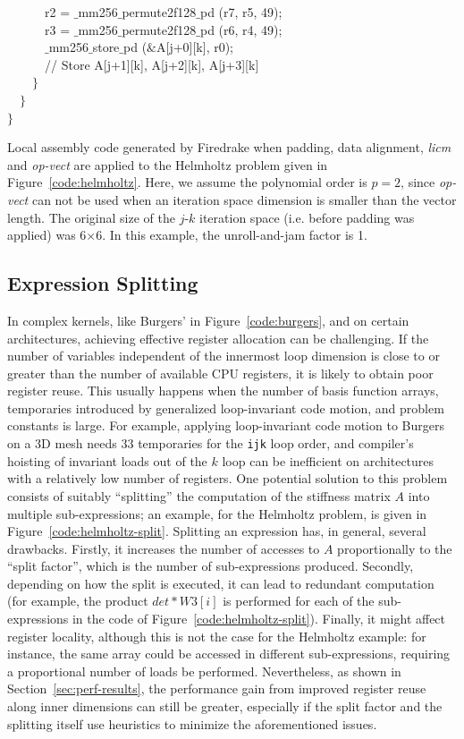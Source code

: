 \documentclass[conference]{IEEEtran}
\begin{document}
\begin{algorithm}[t]
~~~~~~r2 = $\_$mm256$\_$permute2f128$\_$pd (r7, r5, 49);\\
~~~~~~r3 = $\_$mm256$\_$permute2f128$\_$pd (r6, r4, 49);\\
~~~~~~$\_$mm256$\_$store$\_$pd ($\&$A[j+0][k], r0);\\
~~~~~~// Store A[j+1][k], A[j+2][k], A[j+3][k]\\
~~~~$\rbrace$\\
~~$\rbrace$\\
$\rbrace$
\caption{Local assembly code generated by Firedrake when padding, data alignment, \emph{licm} and \emph{op-vect} are applied to the Helmholtz problem given in Figure~\ref{code:helmholtz}. Here, we assume the polynomial order is $p=2$, since \emph{op-vect} can not be used when an iteration space dimension is smaller than the vector length. The original size of the $j$-$k$ iteration space (i.e. before padding was applied) was 6$\times$6. In this example, the unroll-and-jam factor is 1.}
\label{code:helmholtz-opvect}
\end{algorithm}


\subsection{Expression Splitting}
\label{sec:expr-split}
In complex kernels, like Burgers' in Figure~\ref{code:burgers}, and on certain architectures, achieving effective register allocation can be challenging. If the number of variables independent of the innermost loop dimension is close to or greater than the number of available CPU registers, it is likely to obtain poor register reuse. This usually happens when the number of basis function arrays, temporaries introduced by generalized loop-invariant code motion, and problem constants is large. For example, applying loop-invariant code motion to Burgers on a 3D mesh needs 33 temporaries for the \texttt{ijk} loop order, and compiler's hoisting of invariant loads out of the $k$ loop can be inefficient on architectures with a relatively low number of registers. One potential solution to this problem consists of suitably ``splitting'' the computation of the stiffness matrix $A$ into multiple sub-expressions; an example, for the Helmholtz problem, is given in Figure~\ref{code:helmholtz-split}. Splitting an expression has, in general, several drawbacks. Firstly, it increases the number of accesses to $A$ proportionally to the ``split factor'', which is the number of sub-expressions produced. Secondly, depending on how the split is executed, it can lead to redundant computation (for example, the product $det*W3[i]$ is performed for each of the sub-expressions in the code of Figure~\ref{code:helmholtz-split}). Finally, it might affect register locality, although this is not the case for the Helmholtz example: for instance, the same array could be accessed in different sub-expressions, requiring a proportional number of loads be performed. Nevertheless, as shown in Section~\ref{sec:perf-results}, the performance gain from improved register reuse along inner dimensions can still be greater, especially if the split factor and the splitting itself use heuristics to minimize the aforementioned issues.
\end{document}
